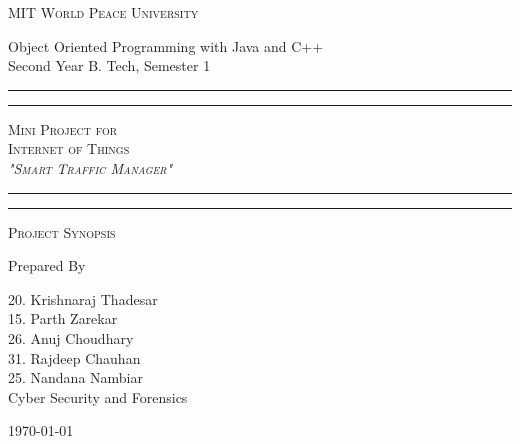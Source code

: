 \documentclass[11pt]{article}
\begin{document}
\begin{titlepage}
	\centering


	\huge\textsc{
		MIT World Peace University
	}\\

	\vspace{0.75\baselineskip} %

	\LARGE{
		Object Oriented Programming with Java and C++\\
		Second Year B. Tech, Semester 1
	}

	\vfill %


	\rule{\textwidth}{1.6pt}\vspace*{-\baselineskip}\vspace*{2pt}
	\rule{\textwidth}{0.6pt}
	\vspace{0.75\baselineskip} %



	\huge{\textsc{
			Mini Project for
			\\Internet of Things\\
			\textit{"Smart Traffic Manager"}
		}} \\



	\vspace{0.5\baselineskip} %
	\rule{\textwidth}{0.6pt}\vspace*{-\baselineskip}\vspace*{2.8pt}
	\rule{\textwidth}{1.6pt}

	\vspace{1\baselineskip} %


	\LARGE\textsc{
		Project Synopsis
	} %
	\vfill


	Prepared By
	\vspace{0.5\baselineskip} %

	\Large{
		20. Krishnaraj Thadesar \\
		15. Parth Zarekar\\
		26. Anuj Choudhary\\
		31. Rajdeep Chauhan\\
		25. Nandana Nambiar\\
		Cyber Security and Forensics\\
	}


	\vspace{0.5\baselineskip} %
	\today

\end{titlepage}
\end{document}
